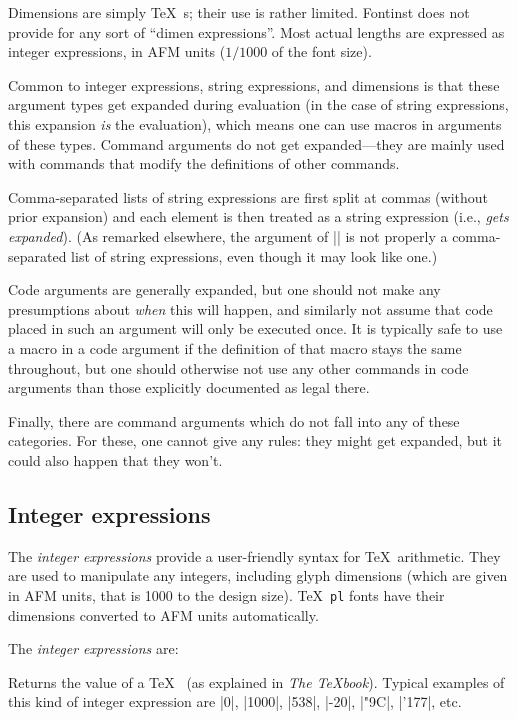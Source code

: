 \documentclass[a4paper]{ltxguide}
\newcommand*{\meta}{\m}
\newcommand*{\setfilename}[1]{\texttt{#1}}
\newcommand*{\setpackagename}[1]{\textsf{#1}}
\newcommand{\Fontinst}{\setpackagename{Font\-inst}\xspace}
\newcommand{\pl} {\setfilename{pl}\xspace}
\begin{document}
Dimensions are simply \TeX\ \meta{dimen}s; their use is rather 
limited. \Fontinst does not provide for any sort of ``dimen 
expressions''. Most actual lengths are expressed as integer 
expressions, in AFM units ($1/1000$ of the font size).

Common to integer expressions, string expressions, and 
dimensions is that these argument types get expanded during 
evaluation (in the case of string expressions, this expansion 
\emph{is} the evaluation), which means one can use macros in 
arguments of these types. Command arguments do not get 
expanded---they are mainly used with commands that modify the 
definitions of other commands.

Comma-separated lists of string expressions are first split at commas 
(without prior expansion) and each element is then treated as a 
string expression (i.e., \emph{gets expanded}). (As remarked elsewhere, 
the \meta{metrics-list} argument of |\installfont| is not properly a 
comma-separated list of string expressions, even though it may look 
like one.)

Code arguments are generally expanded, but one should not make any 
presumptions about \emph{when} this will happen, and similarly not 
assume that code placed in such an argument will only be executed 
once. It is typically safe to use a macro in a code argument if the 
definition of that macro stays the same throughout, but one should 
otherwise not use any other commands in code arguments than those 
explicitly documented as legal there.

Finally, there are command arguments which do not fall into any of 
these categories. For these, one cannot give any rules: they 
might get expanded, but it could also happen that they won't. 



\subsection{Integer expressions}
\label{Sec:integer}

The \emph{integer expressions} provide a user-friendly syntax for
\TeX\ arithmetic.  They are used to manipulate any integers,
including glyph dimensions (which are given in AFM units, that is
1000 to the design size).  \TeX\ \pl fonts have their dimensions
converted to AFM units automatically.

The \emph{integer expressions} are:

\begin{decl}
\end{decl}
Returns the value of a \TeX\  (as explained in 
\emph{The \TeX book}). Typical examples of this kind of integer 
expression are |0|, |1000|, |538|, |-20|, |"9C|, |'177|, etc.
\end{document}
